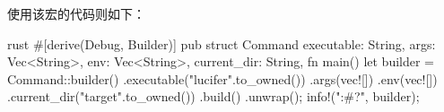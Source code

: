 使用该宏的代码则如下：
\begin{code-block}{rust}
#[derive(Debug, Builder)]
pub struct Command {
    executable: String,
    args: Vec<String>,
    env: Vec<String>,
    current_dir: String,
}
fn main() {
    let builder = Command::builder()
        .executable("lucifer".to_owned())
        .args(vec![])
        .env(vec![])
        .current_dir("target".to_owned())
        .build()
        .unwrap();
    info!("{:#?}", builder);
}
\end{code-block}


